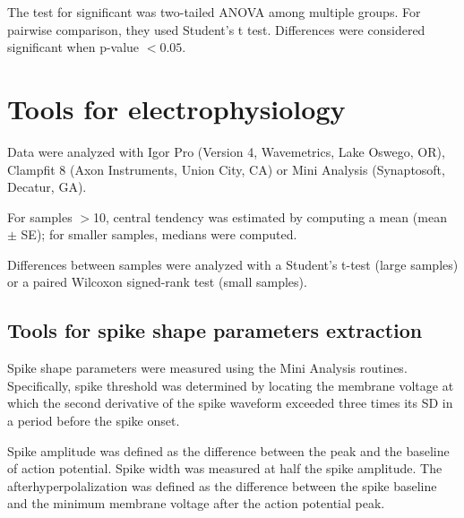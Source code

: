 The test for significant was two-tailed ANOVA among multiple
groups. For pairwise comparison, they used Student's t test. Differences
were considered significant when p-value $< 0.05$. 

\section{Tools for electrophysiology}

Data were analyzed with Igor Pro (Version 4, Wavemetrics, Lake
Oswego, OR), Clampfit 8 (Axon Instruments, Union City, CA) or
Mini Analysis (Synaptosoft, Decatur, GA).

For samples $>$10, central tendency was estimated by computing
a mean (mean $\pm$ SE); for smaller samples, medians were computed. 

Differences between samples were analyzed with a Student's t-test (large
samples) or a paired Wilcoxon signed-rank test (small samples).

\subsection{Tools for spike shape parameters extraction}

Spike shape parameters were measured using the Mini Analysis routines.
Specifically, spike threshold was determined by locating the membrane voltage at
which the second derivative of the spike waveform exceeded three times its SD in
a period before the spike onset.

Spike amplitude was defined as
the difference between the peak and the baseline of action potential.
Spike width was measured at half the spike amplitude. The afterhyperpolalization
was defined as the difference between the spike baseline
and the minimum membrane voltage after the action potential
peak.


